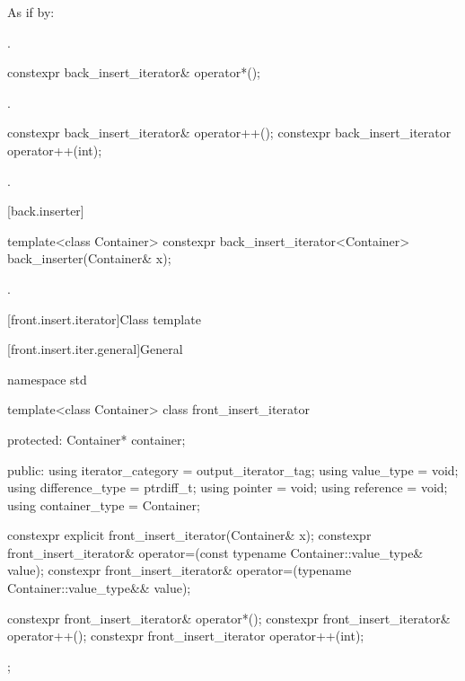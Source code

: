 \begin{itemdescr}
\pnum
\effects
As if by: 

\pnum
\returns
{}.
\end{itemdescr}

%
\begin{itemdecl}
constexpr back_insert_iterator& operator*();
\end{itemdecl}

\begin{itemdescr}
\pnum
\returns
{}.
\end{itemdescr}

%
\begin{itemdecl}
constexpr back_insert_iterator& operator++();
constexpr back_insert_iterator  operator++(int);
\end{itemdecl}

\begin{itemdescr}
\pnum
\returns
{}.
\end{itemdescr}

[back.inserter]{ }

%
\begin{itemdecl}
template<class Container>
  constexpr back_insert_iterator<Container> back_inserter(Container& x);
\end{itemdecl}

\begin{itemdescr}
\pnum
\returns
{}.
\end{itemdescr}

[front.insert.iterator]{Class template }

[front.insert.iter.general]{General}

%
\begin{codeblock}
namespace std {
  template<class Container>
  class front_insert_iterator {
  protected:
    Container* container;

  public:
    using iterator_category = output_iterator_tag;
    using value_type        = void;
    using difference_type   = ptrdiff_t;
    using pointer           = void;
    using reference         = void;
    using container_type    = Container;

    constexpr explicit front_insert_iterator(Container& x);
    constexpr front_insert_iterator& operator=(const typename Container::value_type& value);
    constexpr front_insert_iterator& operator=(typename Container::value_type&& value);

    constexpr front_insert_iterator& operator*();
    constexpr front_insert_iterator& operator++();
    constexpr front_insert_iterator  operator++(int);
  };
}
\end{codeblock}


